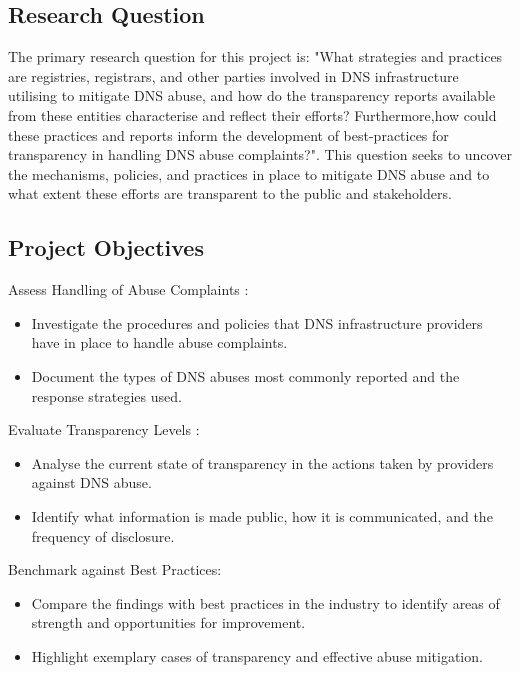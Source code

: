 \subsection{Research Question}

The primary research question for this project is: "What strategies and practices are registries, registrars, and other parties involved in DNS infrastructure utilising to mitigate DNS abuse, and how do the transparency reports available from these entities characterise and reflect their efforts? Furthermore,how could these practices and reports inform the development of best-practices for transparency in handling DNS abuse complaints?". This question seeks to uncover the mechanisms, policies, and practices in place to mitigate DNS abuse and to what extent these efforts are transparent to the public and stakeholders.

\subsection{Project Objectives}

Assess Handling of Abuse Complaints :

\begin{itemize}
  \item Investigate the procedures and policies that DNS infrastructure providers have in place to handle abuse complaints.
  \item Document the types of DNS abuses most commonly reported and the response strategies used.
\end{itemize}

Evaluate Transparency Levels :

\begin{itemize}
  \item Analyse the current state of transparency in the actions taken by providers against DNS abuse.
  \item Identify what information is made public, how it is communicated, and the frequency of disclosure.
\end{itemize}

Benchmark against Best Practices:

\begin{itemize}
  \item Compare the findings with best practices in the industry to identify areas of strength and opportunities for improvement.
  \item Highlight exemplary cases of transparency and effective abuse mitigation.
\end{itemize}

